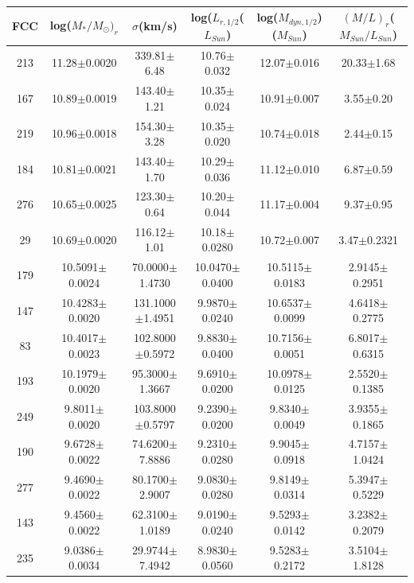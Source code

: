 \documentclass{aa}
\begin{document}
\begin{table}
\begin{center}
\caption{}
{\renewcommand{\arraystretch}{1.}
\resizebox{18cm}{!} {
\begin{tabular}{|cccccc|}
\hline 
FCC & log($M_*/M_{\odot})_r$ & $\sigma$(km/s) & log($L_{r,1/2}$($L_{Sun}$) & log($M_{dyn,1/2}$)($M_{Sun}$) & $(M/L)_r$($M_{Sun}/L_{Sun}$) \\
\hline \hline
213 & 11.28$\pm$0.0020 & 339.81$\pm$6.48 & 10.76$\pm$0.032 & 12.07$\pm$0.016 & 20.33$\pm$1.68 \\
167 & 10.89$\pm$0.0019 & 143.40$\pm$1.21 & 10.35$\pm$0.024 & 10.91$\pm$0.007 & 3.55$\pm$0.20 \\
219 & 10.96$\pm$0.0018 & 154.30$\pm$3.28 & 10.35$\pm$0.020 & 10.74$\pm$0.018 & 2.44$\pm$0.15 \\
184 & 10.81$\pm$0.0021 & 143.40$\pm$1.70 & 10.29$\pm$0.036 & 11.12$\pm$0.010 & 6.87$\pm$0.59 \\
276 & 10.65$\pm$0.0025 & 123.30$\pm$0.64 & 10.20$\pm$0.044 & 11.17$\pm$0.004 & 9.37$\pm$0.95 \\
29 & 10.69$\pm$0.0020 & 116.12$\pm$1.01 & 10.18$\pm$0.0280 & 10.72$\pm$0.007 & 3.47$\pm$0.2321 \\
179 & 10.5091$\pm$0.0024 & 70.0000$\pm$1.4730 & 10.0470$\pm$0.0400 & 10.5115$\pm$0.0183 & 2.9145$\pm$0.2951 \\
147 & 10.4283$\pm$0.0020 & 131.1000$\pm$1.4951 & 9.9870$\pm$0.0240 & 10.6537$\pm$0.0099 & 4.6418$\pm$0.2775 \\
83 & 10.4017$\pm$0.0023 & 102.8000$\pm$0.5972 & 9.8830$\pm$0.0400 & 10.7156$\pm$0.0051 & 6.8017$\pm$0.6315 \\
193 & 10.1979$\pm$0.0020 & 95.3000$\pm$1.3667 & 9.6910$\pm$0.0200 & 10.0978$\pm$0.0125 & 2.5520$\pm$0.1385 \\
249 & 9.8011$\pm$0.0020 & 103.8000$\pm$0.5797 & 9.2390$\pm$0.0200 & 9.8340$\pm$0.0049 & 3.9355$\pm$0.1865 \\
190 & 9.6728$\pm$0.0022 & 74.6200$\pm$7.8886 & 9.2310$\pm$0.0280 & 9.9045$\pm$0.0918 & 4.7157$\pm$1.0424 \\ \hline
277 & 9.4690$\pm$0.0022 & 80.1700$\pm$2.9007 & 9.0830$\pm$0.0280 & 9.8149$\pm$0.0314 & 5.3947$\pm$0.5229 \\
143 & 9.4560$\pm$0.0022 & 62.3100$\pm$1.0189 & 9.0190$\pm$0.0240 & 9.5293$\pm$0.0142 & 3.2382$\pm$0.2079 \\
235 & 9.0386$\pm$0.0034 & 29.9744$\pm$7.4942 & 8.9830$\pm$0.0560 & 9.5283$\pm$0.2172 & 3.5104$\pm$1.8128 \\

\end{tabular}}}
\end{center}
\end{table}
\end{document}
